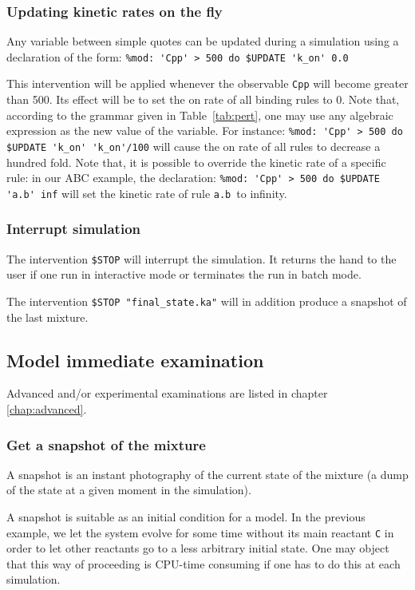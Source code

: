 \documentclass[11pt]{book}
\def\ttt#1{\texttt{#1}}
\def\var#1{{\textquotesingle}#1{\textquotesingle}}
\def\noi{\noindent}
\begin{document}
\subsubsection{Updating kinetic rates on the fly}

Any variable between simple quotes can be updated during a simulation using a declaration of the form:
\lstinline[language=kappa]!%mod: 'Cpp' > 500 do $UPDATE 'k_on' 0.0!

This intervention will be applied whenever the observable \ttt{\var{Cpp}} will become greater than 500. Its effect will be to set the on rate of all binding rules to 0. Note that, according to the grammar given in Table~\ref{tab:pert}, one may use any algebraic expression as the new value of the variable. For instance:
\lstinline[language=kappa]!%mod: 'Cpp' > 500 do $UPDATE 'k_on' 'k_on'/100!
\noi will cause the on rate of all rules to decrease a hundred fold. Note that, it is possible to override the kinetic rate of a specific rule:  in our ABC example, the declaration:
\lstinline[language=kappa]!%mod: 'Cpp' > 500 do $UPDATE 'a.b' inf!
\noi will set the kinetic rate of rule \ttt{\var{a.b}}~to infinity.

\subsubsection{Interrupt simulation}
The intervention \ttt{\$STOP} will interrupt the simulation. It
returns the hand to the user if one run in interactive mode or
terminates the run in batch mode.

The intervention \ttt{\$STOP "final\_state.ka"} will in addition
produce a snapshot of the last mixture.

\subsection{Model immediate examination}
Advanced and/or experimental examinations are listed in chapter \ref{chap:advanced}.

\subsubsection{Get a snapshot of the mixture}

A snapshot is an instant photography of the current state of the
mixture (a dump of the state at a given moment in the simulation).

A snapshot is suitable as an initial condition for a model.
In the previous example, we let the system evolve for some time
without its main reactant \ttt{C} in order to let other reactants go
to a less arbitrary initial state. One may object that this way of
proceeding is CPU-time consuming if one has to do this at each
simulation.
\end{document}
